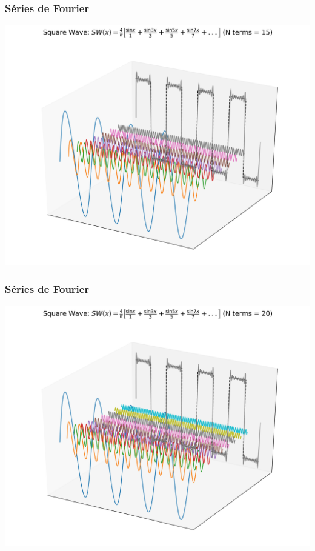 \documentclass{beamer}
\begin{document}
\begin{frame}
\frametitle{Séries de Fourier}
\begin{center}
\includegraphics[scale=0.4]{Figuras/sqw15.jpg}
\end{center}
\end{frame}
\begin{frame}
\frametitle{Séries de Fourier}
\begin{center}
\includegraphics[scale=0.4]{Figuras/sqw20.jpg}
\end{center}
\end{frame}
\end{document}
